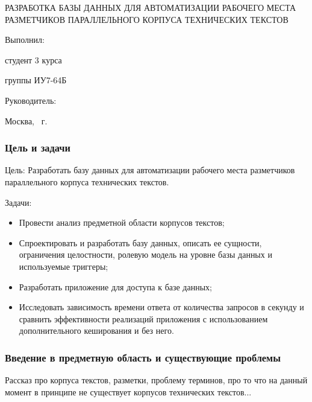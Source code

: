\documentclass{beamer}
\begin{document}
\begingroup
{}

\begin{frame}
\begin{center}
\Large РАЗРАБОТКА БАЗЫ ДАННЫХ ДЛЯ АВТОМАТИЗАЦИИ РАБОЧЕГО МЕСТА РАЗМЕТЧИКОВ ПАРАЛЛЕЛЬНОГО КОРПУСА ТЕХНИЧЕСКИХ ТЕКСТОВ
\end{center}

\vfill

\begin{minipage}[t]{0.45\textwidth}
    \raggedright
    Выполнил:

    студент 3 курса

    группы ИУ7-64Б

\end{minipage}
\hfill
\begin{minipage}[t]{0.45\textwidth}
    \raggedleft
    Руководитель:

\end{minipage}

\vfill

\begin{center}
    Москва, \the\year\ г.
\end{center}
\end{frame}
\endgroup

\begin{frame}
    \frametitle{Цель и задачи}
    Цель: Разработать базу данных для автоматизации рабочего места разметчиков параллельного корпуса технических текстов.

    \vfill

    Задачи:
    \begin{itemize}
        \item Провести анализ предметной области корпусов текстов;
        \item Спроектировать и разработать базу данных, описать ее сущности, ограничения целостности, ролевую модель на уровне базы данных и используемые триггеры;
        \item Разработать приложение для доступа к базе данных;
        \item Исследовать зависимость времени ответа от количества запросов в секунду и сравнить эффективности реализаций приложения с использованием дополнительного кеширования и без него.
    \end{itemize}
\end{frame}

\begin{frame}
    \frametitle{Введение в предметную область и существующие проблемы}
    Рассказ про корпуса текстов, разметки, проблему терминов, про то что на данный момент в принципе не существует корпусов технических текстов...
\end{frame}
\end{document}
